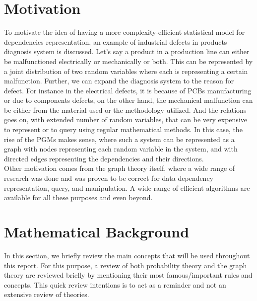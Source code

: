 \documentclass{article}
\begin{document}
\section{Motivation}
To motivate the idea of having a more complexity-efficient statistical model for dependencies representation, an example of industrial defects in products diagnosis system is discussed. Let's say a product in a production line can either be malfunctioned electrically or mechanically or both. This can be represented by a joint distribution of two random variables where each is representing a certain malfunction. Further, we can expand the diagnosis system to the reason for defect. For instance in the electrical defects, it is because of PCBs manufacturing or due to components defects, on the other hand, the mechanical malfunction can be either from the material used or the methodology utilized. And the relations goes on, with extended number of random variables, that can be very expensive to represent or to query using regular mathematical methods. In this case, the rise of the PGMs makes sense, where such a system can be represented as a graph with nodes representing each random variable in the system, and with directed edges representing the dependencies and their directions. \\
\indent Other motivation comes from the graph theory itself, where a wide range of research was done and was proven to be correct for data dependency representation, query, and manipulation. A wide range of efficient algorithms are available for all these purposes and even beyond.
\section{Mathematical Background}
In this section, we briefly review the main concepts that will be used throughout this report. For this purpose, a review of both probability theory and the graph theory are reviewed briefly by mentioning their most famous/important rules and concepts. This quick review intentions is to act as a reminder and not an extensive review of theories. 
\end{document}
